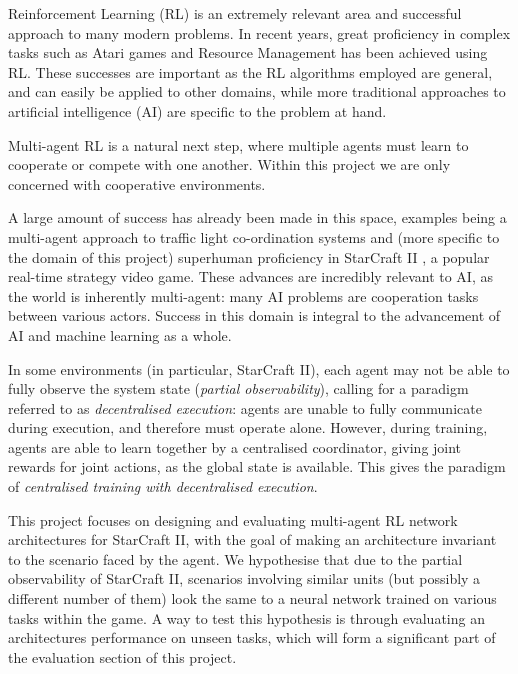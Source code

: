 Reinforcement Learning (RL) is an extremely relevant area and successful approach to many modern problems. In recent years, great proficiency in complex tasks such as Atari games \cite{dqn} and Resource Management \cite{resourcemanagement} has been achieved using RL. These successes are important as the RL algorithms employed are general, and can easily be applied to other domains, while more traditional approaches to artificial intelligence (AI) are specific to the problem at hand. 

Multi-agent RL is a natural next step, where multiple agents must learn to cooperate or compete with one another. Within this project we are only concerned with cooperative environments. 

A large amount of success has already been made in this space, examples being a multi-agent approach to traffic light co-ordination systems \cite{traffic} and (more specific to the domain of this project) superhuman proficiency in StarCraft II \cite{alphastar}, a popular real-time strategy video game. These advances are incredibly relevant to AI, as the world is inherently multi-agent: many AI problems are cooperation tasks between various actors. Success in this domain is integral to the advancement of AI and machine learning as a whole.

In some environments (in particular, StarCraft II), each agent may not be able to fully observe the system state (\textit{partial observability}), calling for a paradigm referred to as \textit{decentralised execution}: agents are unable to fully communicate during execution, and therefore must operate alone. However, during training, agents are able to learn together by a centralised coordinator, giving joint rewards for joint actions, as the global state is available. This gives the paradigm of \textit{centralised training with decentralised execution}.







This project focuses on designing and evaluating multi-agent RL network architectures for StarCraft II, with the goal of making an architecture invariant to the scenario faced by the agent. We hypothesise that due to the partial observability of StarCraft II, scenarios involving similar units (but possibly a different number of them) look the same to a neural network trained on various tasks within the game. A way to test this hypothesis is through evaluating an architectures performance on unseen tasks, which will form a significant part of the evaluation section of this project.

